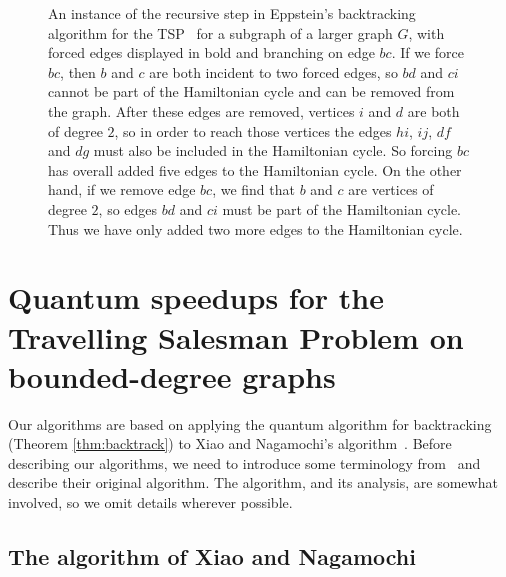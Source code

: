 \begin{figure*}
\begin{center}
\end{center}
\caption[An instance of the recursive step in Eppstein's algorithm]{An instance of the recursive step in Eppstein's backtracking algorithm for the TSP~\cite{eppstein2007} for a subgraph of a larger graph $G$, with forced edges displayed in bold and  branching on edge $bc$. If we force $bc$, then $b$ and $c$ are both incident to two forced edges, so $bd$ and $ci$ cannot be part of the Hamiltonian cycle and can be removed from the graph. After these edges are removed, vertices $i$ and $d$ are both of degree $2$, so in order to reach those vertices the edges $hi$, $ij$, $df$ and $dg$ must also be included in the Hamiltonian cycle. So forcing $bc$ has overall added five edges to the Hamiltonian cycle. On the other hand, if we remove edge $bc$, we find that $b$ and $c$ are vertices of degree $2$, so edges $bd$ and $ci$ must be part of the Hamiltonian cycle. Thus we have only added two more edges to the Hamiltonian cycle.
\label{fig:size-decrease-by-two}}
\end{figure*}


\section{Quantum speedups for the Travelling Salesman Problem on bounded-degree graphs \label{sec:bd}}
\label{sec:deg3}

Our algorithms are based on applying the quantum algorithm for backtracking (Theorem \ref{thm:backtrack}) to Xiao and Nagamochi's algorithm~\cite{xiao2016degree3}. Before describing our algorithms, we need to introduce some terminology from~\cite{xiao2016degree3} and describe their original algorithm. The algorithm, and its analysis, are somewhat involved, so we omit details wherever possible.

\subsection{The algorithm of Xiao and Nagamochi}
\label{sec:xndeg3}

